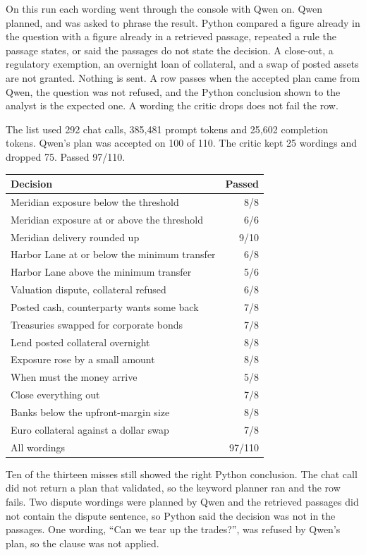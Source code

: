 \documentclass[11pt,a4paper]{article}
\begin{document}
On this run each wording went through the console with Qwen on. Qwen planned, and was asked to phrase the result. Python compared a figure already in the question with a figure already in a retrieved passage, repeated a rule the passage states, or said the passages do not state the decision. A close-out, a regulatory exemption, an overnight loan of collateral, and a swap of posted assets are not granted. Nothing is sent. A row passes when the accepted plan came from Qwen, the question was not refused, and the Python conclusion shown to the analyst is the expected one. A wording the critic drops does not fail the row.

The list used 292 chat calls, 385{,}481 prompt tokens and 25{,}602 completion tokens. Qwen's plan was accepted on 100 of 110. The critic kept 25 wordings and dropped 75. Passed 97/110.

\begin{center}
\small
\begin{tabular}{@{}p{7.2cm}r@{}}
\toprule
Decision & Passed \\
\midrule
Meridian exposure below the threshold & 8/8 \\
Meridian exposure at or above the threshold & 6/6 \\
Meridian delivery rounded up & 9/10 \\
Harbor Lane at or below the minimum transfer & 6/8 \\
Harbor Lane above the minimum transfer & 5/6 \\
Valuation dispute, collateral refused & 6/8 \\
Posted cash, counterparty wants some back & 7/8 \\
Treasuries swapped for corporate bonds & 7/8 \\
Lend posted collateral overnight & 8/8 \\
Exposure rose by a small amount & 8/8 \\
When must the money arrive & 5/8 \\
Close everything out & 7/8 \\
Banks below the upfront-margin size & 8/8 \\
Euro collateral against a dollar swap & 7/8 \\
\midrule
All wordings & 97/110 \\
\bottomrule
\end{tabular}
\end{center}

Ten of the thirteen misses still showed the right Python conclusion. The chat call did not return a plan that validated, so the keyword planner ran and the row fails. Two dispute wordings were planned by Qwen and the retrieved passages did not contain the dispute sentence, so Python said the decision was not in the passages. One wording, ``Can we tear up the trades?'', was refused by Qwen's plan, so the clause was not applied.
\end{document}
